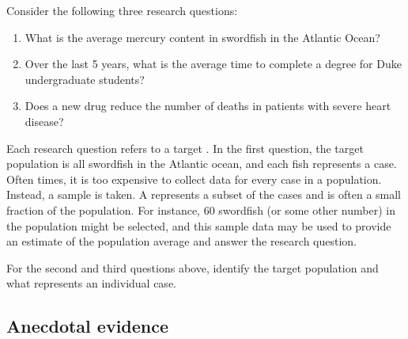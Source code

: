 \noindent%
Consider the following three research questions:
\begin{enumerate}
\setlength{\itemsep}{0mm}
\item What is the average mercury content in swordfish in the Atlantic Ocean?
\item\label{timeToGraduationQuestionForUCLAStudents} Over the last 5 years, what is the average time to complete a degree for Duke undergraduate students?
\item\label{identifyPopulationOfStentStudy} Does a new drug reduce the number of deaths in patients with severe heart disease?
\end{enumerate}
Each research question refers to a target . In the first question, the target population is all swordfish in the Atlantic ocean, and each fish represents a case. Often times, it is too expensive to collect data for every case in a population. Instead, a sample is taken. A  represents a subset of the cases and is often a small fraction of the population. For instance, 60 swordfish (or some other number) in the population might be selected, and this sample data may be used to provide an estimate of the population average and answer the research question.

\begin{exercisewrap}
\begin{nexercise}\label{identifyingThePopulationForTwoQuestionsInPopAndSampSubsection}%
For the second and third questions above,
identify the target population and what
represents an individual case.\footnotemark
\end{nexercise}
\end{exercisewrap}


\subsection{Anecdotal evidence}
\label{anecdotalEvidenceSubsection}


